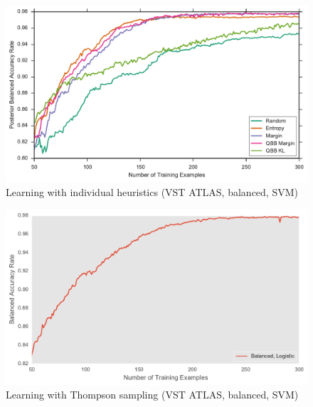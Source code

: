 \begin{figure}[p]
	\centering
	\includegraphics[width=\textwidth]{figures/5_active/vstatlas_ur_individuals}
	\caption[Learning with individual heuristics (VST ATLAS, unbalanced, SVM)]{
		Learning with individual heuristics (VST ATLAS, balanced, SVM)}
	\label{fig:vstatlas_ur_individuals}
\end{figure}

\begin{figure}[p]
	\centering
	\includegraphics[width=\textwidth]{figures/5_thompson/vstatlas_ur_thompson}
	\caption[Learning with Thompson sampling (VST ATLAS, unbalanced, SVM)]{
		Learning with Thompson sampling (VST ATLAS, balanced, SVM)}
	\label{fig:vstatlas_ur_thompson}
\end{figure}

